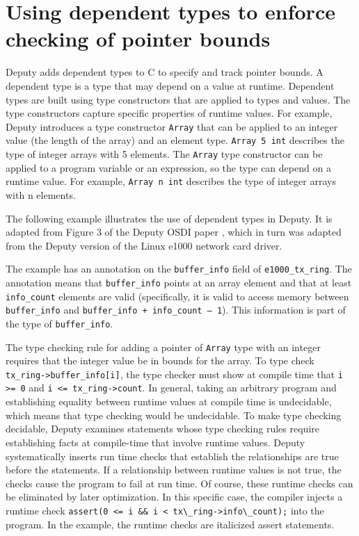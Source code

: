 \section{Using dependent types to enforce checking of pointer bounds}\label{using-dependent-types-to-enforce-checking-of-pointer-bounds}

Deputy adds dependent types to C to specify and track pointer bounds. A
dependent type is a type that may depend on a value at runtime.
Dependent types are built using type constructors that are applied to
types and values. The type constructors capture specific properties of
runtime values. For example, Deputy introduces a type constructor
\verb|Array| that can be applied to an integer value (the length of the
array) and an element type. \verb|Array 5 int| describes the type of
integer arrays with 5 elements. The \verb|Array| type constructor can be
applied to a program variable or an expression, so the type can depend
on a runtime value. For example, \verb|Array n int| describes the type
of integer arrays with n elements.

The following example illustrates the use of dependent types in Deputy.
It is adapted from Figure 3 of the Deputy OSDI paper , which in turn was
adapted from the Deputy version of the Linux e1000 network card driver.

The example has an annotation on the \texttt{buffer\_info} field of
\texttt{e1000\_tx\_ring}. The annotation means that
\texttt{buffer\_info} points at an array element and that at least
\texttt{info\_count} elements are valid (specifically, it is valid to
access memory between \texttt{buffer\_info} and \texttt{buffer\_info +
info\_count -- 1}). This information is part of the type of
\texttt{buffer\_info}.

The type checking rule for adding a pointer of \verb|Array| type with an
integer requires that the integer value be in bounds for the array. To
type check \texttt{tx\_ring-\textgreater{}buffer\_info[i]}, the type
checker must show at compile time that \texttt{i \textgreater{}= 0} and
\texttt{i \textless{}= tx\_ring-\textgreater{}count}. In general, taking
an arbitrary program and establishing equality between runtime values at
compile time is undecidable, which means that type checking would be
undecidable. To make type checking decidable, Deputy examines statements
whose type checking rules require establishing facts at compile-time
that involve runtime values. Deputy systematically inserts run time
checks that establish the relationships are true before the statements.
If a relationship between runtime values is not true, the checks cause
the program to fail at run time. Of course, these runtime checks can be
eliminated by later optimization. In this specific case, the compiler
injects a runtime check \verb|assert(0 <= i && i < tx\_ring->info\_count);| into the program. 
In the example, the runtime checks are italicized assert statements.

